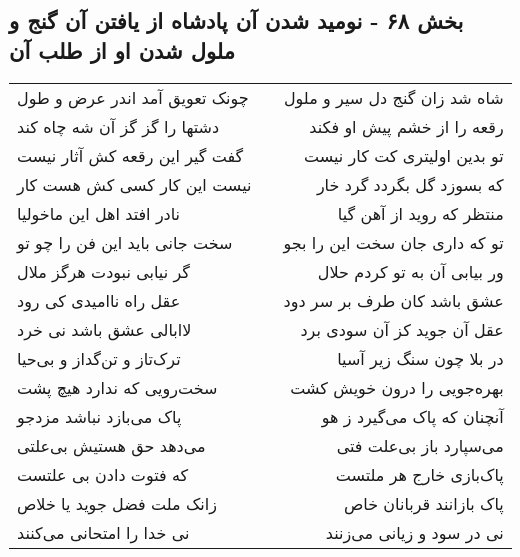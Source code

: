 \begin{center}
\section*{بخش ۶۸ - نومید شدن آن پادشاه از یافتن آن گنج و ملول شدن او از طلب آن}
\label{sec:sh068}
\begin{longtable}{l p{0.5cm} r}
چونک تعویق آمد اندر عرض و طول
&&
شاه شد زان گنج دل سیر و ملول
\\
دشتها را گز گز آن شه چاه کند
&&
رقعه را از خشم پیش او فکند
\\
گفت گیر این رقعه کش آثار نیست
&&
تو بدین اولیتری کت کار نیست
\\
نیست این کار کسی کش هست کار
&&
که بسوزد گل بگردد گرد خار
\\
نادر افتد اهل این ماخولیا
&&
منتظر که روید از آهن گیا
\\
سخت جانی باید این فن را چو تو
&&
تو که داری جان سخت این را بجو
\\
گر نیابی نبودت هرگز ملال
&&
ور بیابی آن به تو کردم حلال
\\
عقل راه ناامیدی کی رود
&&
عشق باشد کان طرف بر سر دود
\\
لاابالی عشق باشد نی خرد
&&
عقل آن جوید کز آن سودی برد
\\
ترک‌تاز و تن‌گداز و بی‌حیا
&&
در بلا چون سنگ زیر آسیا
\\
سخت‌رویی که ندارد هیچ پشت
&&
بهره‌جویی را درون خویش کشت
\\
پاک می‌بازد نباشد مزدجو
&&
آنچنان که پاک می‌گیرد ز هو
\\
می‌دهد حق هستیش بی‌علتی
&&
می‌سپارد باز بی‌علت فتی
\\
که فتوت دادن بی علتست
&&
پاک‌بازی خارج هر ملتست
\\
زانک ملت فضل جوید یا خلاص
&&
پاک بازانند قربانان خاص
\\
نی خدا را امتحانی می‌کنند
&&
نی در سود و زیانی می‌زنند
\\
\end{longtable}
\end{center}
